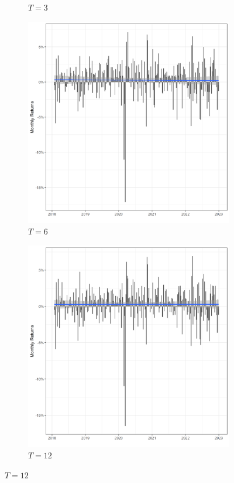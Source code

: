 \begin{figure}
\begin{subfigure}[b]{0.49\textwidth}
         \caption{$T = 3$}
         \label{fig:three sin x}
     \end{subfigure}
     \hfill
     \begin{subfigure}[b]{0.49\textwidth}
         \centering
         \includegraphics[width=\textwidth]{Projekt/1.Figures analysis/LT_positive_returns_6.png}
         \caption{$T = 6$}
         \label{fig:five over x}
     \end{subfigure}
     \hfill
     \begin{subfigure}[b]{0.49\textwidth}
         \centering
         \includegraphics[width=\textwidth]{Projekt/1.Figures analysis/LT_positive_returns_12.png}
         \caption{$T = 12$}
         \label{fig:five over x}
     \end{subfigure}
        

\end{figure}
